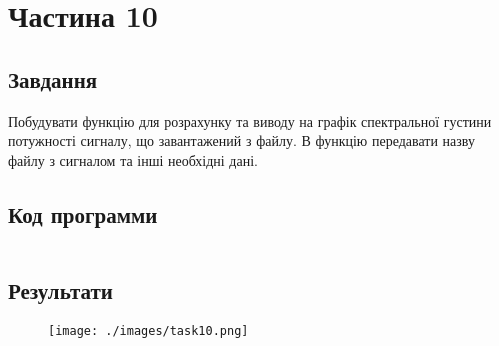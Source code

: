 \section{Частина 10}
\label{sec:task10}

\subsection{Завдання}
\label{subsec:task10_task}

Побудувати функцію для розрахунку та виводу на графік
спектральної густини потужності сигналу, що завантажений з файлу.
В функцію передавати назву файлу з сигналом та інші необхідні дані.

\subsection{Код программи}
\label{subsec:task10_code}
\inputminted{python}{../src/task10.py}

\subsection{Результати}
\label{subsec:task10_results}

\begin{figure}[!ht]
    \centering
    \texttt{[image: ./images/task10.png]}
\end{figure}
